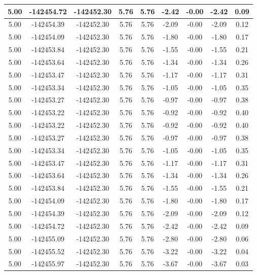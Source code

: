 \begin{table}[htbp]
\begin{adjustbox}{angle=90}
\begin{tabular}{|c|c|c|c|c|c|c|c|c|}
 5.00 & -142454.72 & -142452.30 & 5.76 & 5.76 & -2.42 & -0.00 & -2.42 & 0.09\\ \hline
 5.00 & -142454.39 & -142452.30 & 5.76 & 5.76 & -2.09 & -0.00 & -2.09 & 0.12\\ \hline
 5.00 & -142454.09 & -142452.30 & 5.76 & 5.76 & -1.80 & -0.00 & -1.80 & 0.17\\ \hline
 5.00 & -142453.84 & -142452.30 & 5.76 & 5.76 & -1.55 & -0.00 & -1.55 & 0.21\\ \hline
 5.00 & -142453.64 & -142452.30 & 5.76 & 5.76 & -1.34 & -0.00 & -1.34 & 0.26\\ \hline
 5.00 & -142453.47 & -142452.30 & 5.76 & 5.76 & -1.17 & -0.00 & -1.17 & 0.31\\ \hline
 5.00 & -142453.34 & -142452.30 & 5.76 & 5.76 & -1.05 & -0.00 & -1.05 & 0.35\\ \hline
 5.00 & -142453.27 & -142452.30 & 5.76 & 5.76 & -0.97 & -0.00 & -0.97 & 0.38\\ \hline
 5.00 & -142453.22 & -142452.30 & 5.76 & 5.76 & -0.92 & -0.00 & -0.92 & 0.40\\ \hline
 5.00 & -142453.22 & -142452.30 & 5.76 & 5.76 & -0.92 & -0.00 & -0.92 & 0.40\\ \hline
 5.00 & -142453.27 & -142452.30 & 5.76 & 5.76 & -0.97 & -0.00 & -0.97 & 0.38\\ \hline
 5.00 & -142453.34 & -142452.30 & 5.76 & 5.76 & -1.05 & -0.00 & -1.05 & 0.35\\ \hline
 5.00 & -142453.47 & -142452.30 & 5.76 & 5.76 & -1.17 & -0.00 & -1.17 & 0.31\\ \hline
 5.00 & -142453.64 & -142452.30 & 5.76 & 5.76 & -1.34 & -0.00 & -1.34 & 0.26\\ \hline
 5.00 & -142453.84 & -142452.30 & 5.76 & 5.76 & -1.55 & -0.00 & -1.55 & 0.21\\ \hline
 5.00 & -142454.09 & -142452.30 & 5.76 & 5.76 & -1.80 & -0.00 & -1.80 & 0.17\\ \hline
 5.00 & -142454.39 & -142452.30 & 5.76 & 5.76 & -2.09 & -0.00 & -2.09 & 0.12\\ \hline
 5.00 & -142454.72 & -142452.30 & 5.76 & 5.76 & -2.42 & -0.00 & -2.42 & 0.09\\ \hline
 5.00 & -142455.09 & -142452.30 & 5.76 & 5.76 & -2.80 & -0.00 & -2.80 & 0.06\\ \hline
 5.00 & -142455.52 & -142452.30 & 5.76 & 5.76 & -3.22 & -0.00 & -3.22 & 0.04\\ \hline
 5.00 & -142455.97 & -142452.30 & 5.76 & 5.76 & -3.67 & -0.00 & -3.67 & 0.03\\ \hline

\end{tabular}
\end{adjustbox}
\end{table}
